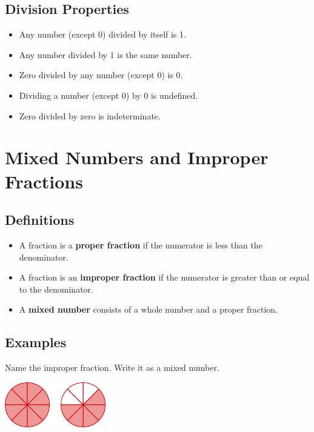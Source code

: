 \documentclass[12pt,twoside]{article}
\begin{document}
\subsection*{Division Properties}
\begin{multicols}{2}
  \begin{itemize}\itemsep=-\parsep
  \item Any number (except 0) divided by itself is 1.
  \item Any number divided by 1 is the same number.
  \item Zero divided by any number (except 0) is 0.
    \columnbreak
  \item Dividing a number (except 0) by 0 is undefined.
  \item Zero divided by zero is indeterminate.
  \end{itemize}
\end{multicols}

\section*{Mixed Numbers and Improper Fractions}

\subsection*{Definitions}

\begin{itemize}\itemsep=-\parsep
\item A fraction is a \textbf{proper fraction} if the numerator is less than the denominator.
\item A fraction is an \textbf{improper fraction} if the numerator is greater than or equal to the denominator.
\item A \textbf{mixed number} consists of a whole number and a proper fraction.
\end{itemize}

\subsection*{Examples}
Name the improper fraction. Write it as a mixed number.
\begin{multienumerate}
  {\includegraphics[width=0.33\textwidth]{Lesson_1_2.jpeg}}
\end{multienumerate}
\end{document}
